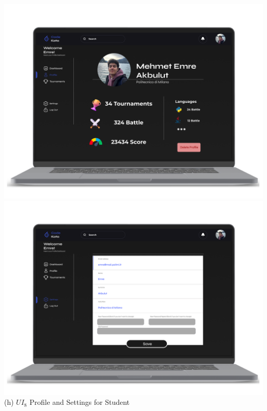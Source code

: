 \begin{center}
\includegraphics[scale=0.13]{Images/ui-ux/student_profile.png}
\includegraphics[scale=0.13]{Images/ui-ux/student_settings.png}
        (h) $UI_{8}$  Profile and Settings for Student
\end{center}
\newpage
